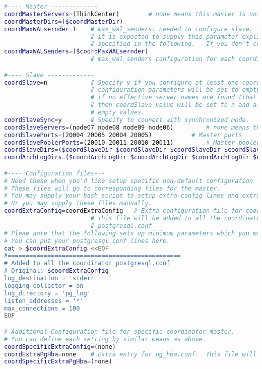 \begin{lstlisting}[language=bash,caption={Konfigurationsdatei pgxc-ctl}]
#---- Master -------------
coordMasterServers=(ThinkCenter)		# none means this master is not available
coordMasterDirs=($coordMasterDir)
coordMaxWALsernder=1	# max_wal_senders: needed to configure slave. If zero value is specified,
						# it is expected to supply this parameter explicitly by external files
						# specified in the following.	If you don't configure slaves, leave this value to zero.
coordMaxWALSenders=($coordMaxWALsernder)
						# max_wal_senders configuration for each coordinator.

#---- Slave -------------
coordSlave=n			# Specify y if you configure at least one coordiantor slave.  Otherwise, the following
						# configuration parameters will be set to empty values.
						# If no effective server names are found (that is, every servers are specified as none),
						# then coordSlave value will be set to n and all the following values will be set to
						# empty values.
coordSlaveSync=y		# Specify to connect with synchronized mode.
coordSlaveServers=(node07 node08 node09 node06)			# none means this slave is not available
coordSlavePorts=(20004 20005 20004 20005)			# Master ports
coordSlavePoolerPorts=(20010 20011 20010 20011)			# Master pooler ports
coordSlaveDirs=($coordSlaveDir $coordSlaveDir $coordSlaveDir $coordSlaveDir)
coordArchLogDirs=($coordArchLogDir $coordArchLogDir $coordArchLogDir $coordArchLogDir)

#---- Configuration files---
# Need these when you'd like setup specific non-default configuration 
# These files will go to corresponding files for the master.
# You may supply your bash script to setup extra config lines and extra pg_hba.conf entries 
# Or you may supply these files manually.
coordExtraConfig=coordExtraConfig	# Extra configuration file for coordinators.  
						# This file will be added to all the coordinators'
						# postgresql.conf
# Pleae note that the following sets up minimum parameters which you may want to change.
# You can put your postgresql.conf lines here.
cat > $coordExtraConfig <<EOF
#================================================
# Added to all the coordinator postgresql.conf
# Original: $coordExtraConfig
log_destination = 'stderr'
logging_collector = on
log_directory = 'pg_log'
listen_addresses = '*'
max_connections = 100
EOF

# Additional Configuration file for specific coordinator master.
# You can define each setting by similar means as above.
coordSpecificExtraConfig=(none)
coordExtraPgHba=none	# Extra entry for pg_hba.conf.  This file will be added to all the coordinators' pg_hba.conf
coordSpecificExtraPgHba=(none)


\end{lstlisting}
